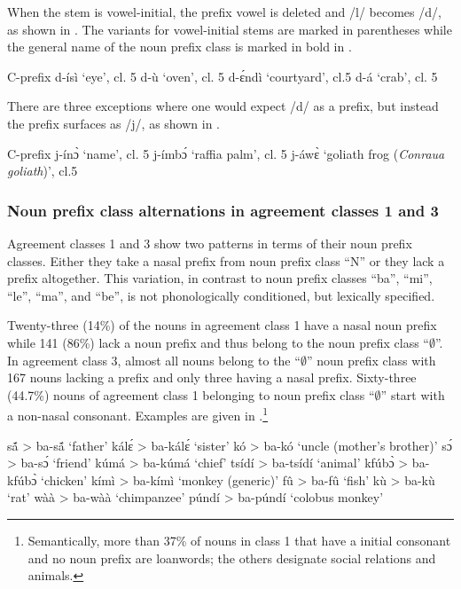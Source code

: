 \noindent When the stem is vowel-initial, the prefix vowel is deleted and /l/ becomes /d/, as shown in . The variants for vowel-initial stems are marked in parentheses while the general name of the noun prefix class is marked in bold in .

\ea\label{Cprefixle} C-prefix
\ea d-ísì `eye', cl. 5
\ex d-ù `oven', cl. 5
\ex d-ɛ́ndì `courtyard', cl.5
\ex d-á `crab', cl. 5
\z
\z

There are three exceptions where one would expect /d/ as a prefix, but instead the prefix surfaces as /j/, as shown in .


\ea\label{Cprefixle2} C-prefix
\ea j-ínɔ̀ `name', cl. 5
\ex j-ímbɔ́ `raffia palm', cl. 5
\ex j-áwɛ̀ `goliath frog ({\itshape Conraua goliath})', cl.5
\z
\z

 



\largerpage
\subsubsection[Noun prefix class alternations]{Noun prefix class alternations in agreement classes 1 and 3} 

Agreement classes 1 and 3 show two patterns in terms of their noun prefix classes. Either they take a nasal prefix from noun prefix class ``N'' or they lack a prefix altogether. This variation, in contrast to noun prefix classes ``ba'', ``mi'', ``le'', ``ma'', and ``be'', is not phonologically conditioned, but lexically specified. 

Twenty-three (14\%)  of the nouns in agreement class 1 have a nasal noun prefix while 141 (86\%) lack a noun prefix and thus belong to the noun prefix class ``$\emptyset$''. In agreement class 3, almost all nouns belong to the ``$\emptyset$'' noun prefix class with 167 nouns lacking a prefix and only three having a nasal prefix. Sixty-three (44.7\%) nouns of agreement class 1 belonging to noun prefix class ``$\emptyset$'' start with a non-nasal consonant. Examples are given in .\footnote{Semantically, more than 37\% of nouns in class 1 that have a initial consonant and no noun prefix are loanwords; the others designate social relations and animals.}

\ea\label{no-C} %
\ea sã́ >  ba-sã́ `father'
\ex kálɛ́ >  ba-kálɛ́ `sister'
\ex kó >  ba-kó `uncle (mother's brother)'
\ex sɔ́ >  ba-sɔ́ `friend'
\ex kúmá >  ba-kúmá `chief'
\ex tsídí >  ba-tsídí `animal'
\ex kfúbɔ̀ >  ba-kfúbɔ̀ `chicken'
\ex kímì >  ba-kímì `monkey (generic)'
\ex fû >  ba-fû `fish'
\ex kù >  ba-kù `rat'
\ex wàà >  ba-wàà `chimpanzee'
\ex púndí >  ba-púndí `colobus monkey'
\z
\z\clearpage

